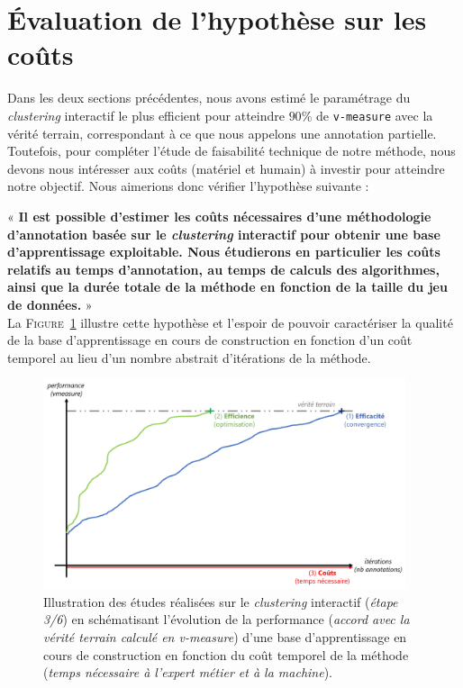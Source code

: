 \section{Évaluation de l'hypothèse sur les coûts}
\label{section:4.3-HYPOTHESE-COUTS}

	Dans les deux sections précédentes, nous avons estimé le paramétrage du \textit{clustering} interactif le plus efficient pour atteindre $90$\% de \texttt{v-measure} avec la vérité terrain, correspondant à ce que nous appelons une annotation partielle.
	Toutefois, pour compléter l'étude de faisabilité technique de notre méthode, nous devons nous intéresser aux coûts (matériel et humain) à investir pour atteindre notre objectif.
	Nous aimerions donc vérifier l'hypothèse suivante :
	
	\begin{tcolorbox}[
		title=\faVial~\textbf{Hypothèse sur les coûts}~\faVial,
		colback=colorTcolorboxHypothesis!15,
		colframe=colorTcolorboxHypothesis!75,
		width=\linewidth
	]
		«\textbf{
			Il est possible d'estimer les coûts nécessaires d'une méthodologie d'annotation basée sur le \textit{clustering} interactif pour obtenir une base d'apprentissage exploitable.
			Nous étudierons en particulier les coûts relatifs au temps d'annotation, au temps de calculs des algorithmes, ainsi que la durée totale de la méthode en fonction de la taille du jeu de données.
		} » \\
		
		La \textsc{Figure~\ref{figure:4.3-HYPOTHESE-COUTS}} illustre cette hypothèse et l'espoir de pouvoir caractériser la qualité de la base d'apprentissage en cours de construction en fonction d'un coût temporel au lieu d'un nombre abstrait d'itérations de la méthode. 
		\begin{figure}[H]  %
			\centering
			\includegraphics[width=0.95\textwidth]{figures/hypotheses-03-couts}
			\caption{
				Illustration des études réalisées sur le \textit{clustering} interactif (\textit{étape 3/6}) en schématisant l'évolution de la performance (\textit{accord avec la vérité terrain calculé en v-measure}) d'une base d'apprentissage en cours de construction en fonction du coût temporel de la méthode (\textit{temps nécessaire à l'expert métier et à la machine}).
			}
			\label{figure:4.3-HYPOTHESE-COUTS}
		\end{figure}
	\end{tcolorbox}

